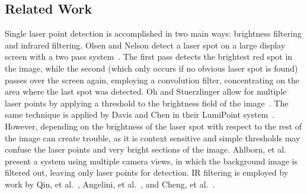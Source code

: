 \documentclass[review]{vgtc}                 %
\begin{document}
\subsection{Related Work}

Single laser point detection is accomplished in two main ways:
brightness filtering and infrared filtering. Olsen and Nelson detect a
laser spot on a large display screen with a two pass
system~\cite{olsen2001}. The first pass detects the brightest red spot
in the image, while the second (which only occurs if no obvious laser
spot is found) passes over the screen again, employing a convolution
filter, concentrating on the area where the last spot was detected. Oh
and Stuerzlinger allow for multiple laser points by applying a
threshold to the brightness field of the
image~\cite{Oh02laserpointers}. The same technique is applied by Davis
and Chen in their LumiPoint
system~\cite{Davis00lumipoint:multi-user}. However, depending on the
brightness of the laser spot with respect to the rest of the image can
create trouble, as it is context sensitive and simple thresholds may
confuse the laser points and very bright sections of the
image. Ahlborn, et al.~\cite{Ahlborn:2005:PSL:1101616.1101637} present
a system using multiple camera views, in which the background image is
filtered out, leaving only laser points for detection. IR filtering is
employed by work by Qin, et al.~\cite{Qin:2010:SLP:1842993.1843022},
Angelini, et al.~\cite{angelini:multi-user}, and Cheng, et
al.~\cite{Cheng:2003:DIL:857080.857088}.
\end{document}
